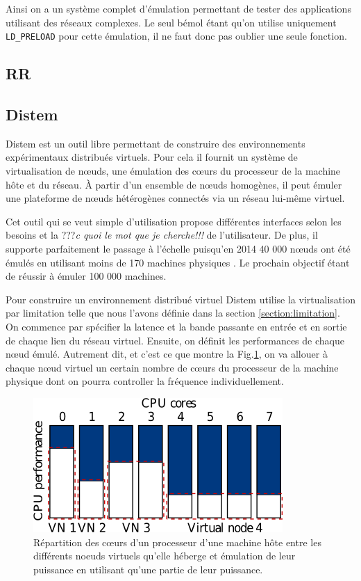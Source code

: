 Ainsi on a un système complet d'émulation permettant de tester des applications utilisant des réseaux complexes. Le seul bémol étant qu'on utilise uniquement \texttt{LD\_PRELOAD} pour cette émulation, il ne faut donc pas oublier une seule fonction.

\subsection{RR}

\subsection{Distem}

Distem \citep{DISTEM} est un outil libre permettant de construire des
environnements expérimentaux distribués virtuels. Pour cela il fournit un
système de virtualisation de n\oe uds, une émulation des c\oe urs du processeur
de la machine hôte et du réseau. À partir d'un ensemble de n\oe uds homogènes,
il peut émuler une plateforme de n\oe uds hétérogènes connectés via un réseau
lui-même virtuel.

Cet outil qui se veut simple d'utilisation propose différentes interfaces selon
les besoins et la ???\textit{c quoi le mot que je cherche!!!} de
l'utilisateur. De plus, il supporte parfaitement le passage à l'échelle
puisqu'en 2014 40 000 n\oe uds ont été émulés en utilisant moins de 170 machines
physiques \citep{DISTEM_buchert2014emulation}. Le prochain objectif étant de
réussir à émuler 100 000 machines.

Pour construire un environnement distribué virtuel Distem utilise la
virtualisation par limitation telle que nous l'avons définie dans la section
\ref{section:limitation}. On commence par spécifier la latence et la bande
passante en entrée et en sortie de chaque lien du réseau virtuel. Ensuite, on
définit les performances de chaque n\oe ud émulé. Autrement dit, et c'est ce que
montre la Fig.\ref{Distem_core}, on va allouer à chaque n\oe ud virtuel un
certain nombre de c\oe urs du processeur de la machine physique dont on pourra
controller la fréquence individuellement.

  \begin{figure}[H]
  \centering
  \includegraphics[scale=0.70]{Pictures/png/Distem_repartion_coeurs_v1}
  \caption{Répartition des c\oe urs d'un processeur d'une machine hôte entre les différents noeuds virtuels qu'elle héberge et émulation de leur puissance en utilisant qu'une partie de leur puissance.}
  \label{Distem_core}
  \end{figure}
  
